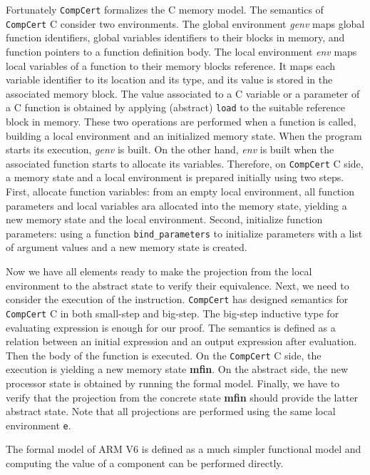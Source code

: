 \documentclass[twocolumn]{article}
\newcommand{\compcert}{\texttt{CompCert}\xspace}
\begin{document}
Fortunately \compcert formalizes the C memory model.  The semantics of
\compcert C consider two environments. The global environment
\emph{genv} maps global function identifiers, global variables
identifiers to their blocks in memory, and function pointers to a
function definition body.  The local environment \emph{env} maps local
variables of a function to their memory blocks reference.  It maps
each variable identifier to its location and its type, and its value
is stored in the associated memory block.  The value associated to a C
variable or a parameter of a C function is obtained by applying
(abstract) \texttt{load} to the suitable reference block in memory.
These two operations are performed when a function is called, building
a local environment and an initialized memory state. When the program
starts its execution, \emph{genv} is built.  On the other hand,
\emph{env} is built when the associated function starts to allocate
its variables. Therefore, on \compcert C side, a memory state and a
local environment is prepared initially using two steps. First,
allocate function variables: from an empty local environment, all
function parameters and local variables ara allocated into the memory
state, yielding a new memory state and the local environment. Second,
initialize function parameters: using a function
\texttt{bind\_parameters} to initialize parameters with a list of
argument values and a new memory state is created.

Now we have all elements ready to make the projection from the local
environment to the abstract state to verify their equivalence.
Next, we need to consider the execution of the instruction.  \compcert
has designed semantics for \compcert C in both small-step and
big-step.  The big-step inductive type for evaluating expression is
enough for our proof.  The semantics is defined as a relation between
an initial expression and an output expression after evaluation.  Then
the body of the function is executed.  On the \compcert C side, the
execution is yielding a new memory state \textbf{mfin}.  On the
abstract side, the new processor state is obtained by running the
formal model.  Finally, we have to verify that the projection from the
concrete state \textbf{mfin} should provide the latter abstract
state.  Note that all projections are performed using the same local
environment \texttt{e}.

The formal model of ARM V6 is defined as a much simpler functional
model and computing the value of a component can be performed
directly.
\end{document}
